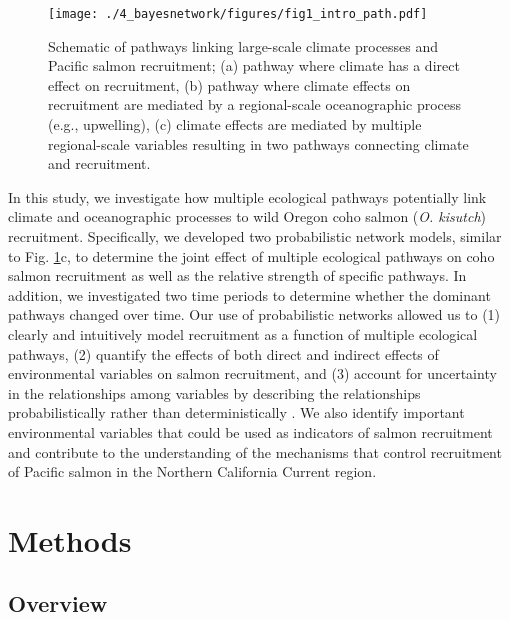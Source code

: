 \begin{figure}[htbp]
  \centering \texttt{[image: ./4\_bayesnetwork/figures/fig1\_intro\_path.pdf]}
  \caption[Schematic of pathways linking large-scale climate processes and
           Pacific salmon recruitment]{Schematic of pathways linking
           large-scale climate processes and Pacific salmon recruitment; (a)
           pathway where climate has a direct effect on recruitment, (b) pathway
           where climate effects on recruitment are mediated by a regional-scale
           oceanographic process (e.g., upwelling), (c) climate effects are
           mediated by multiple regional-scale variables resulting in two
           pathways connecting climate and recruitment.}
  \label{fig:bn:1}
\end{figure}

In this study, we investigate how multiple ecological pathways potentially link
climate and oceanographic processes to wild Oregon coho salmon (\emph{O.
kisutch}) recruitment. Specifically, we developed two probabilistic network
models, similar to Fig. \ref{fig:bn:1}c, to determine the joint effect of
multiple ecological pathways on coho salmon recruitment as well as the relative
strength of specific pathways. In addition, we investigated two time periods to
determine whether the dominant pathways changed over time. Our use of
probabilistic networks allowed us to (1) clearly and intuitively model
recruitment as a function of multiple ecological pathways, (2) quantify the
effects of both direct and indirect effects of environmental variables on salmon
recruitment, and (3) account for uncertainty in the relationships among
variables by describing the relationships probabilistically rather than
deterministically \citep{Varis1995a}. We also identify important environmental
variables that could be used as indicators of salmon recruitment and contribute
to the understanding of the mechanisms that control recruitment of Pacific
salmon in the Northern California Current region.



\section{Methods}

\subsection{Overview}

